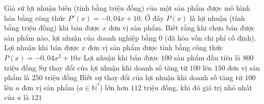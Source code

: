 \begin{ex}%
	Giả sử lợi nhuận biên (tính bằng triệu đồng) của một sản phẩm được mô hình hóa bằng công thức $P'(x)=-0{,}04x+10$. Ở đây $P(x)$ là lợi nhuận (tính bằng triệu đồng) khi bán được $x$ đơn vị sản phẩm. Biết rằng khi chưa bán được sản phẩm nào, lợi nhuận của doanh nghiệp bằng $0$ (đã hòa vốn chi phí cố định).
	\choiceTF
	{Lợi nhuận khi bán được $x$ đơn vị sản phẩm được tính bằng công thức $P(x)=-0{,}04x^2+10x$}
	{\True Lợi nhuận khi bán được $100$ sản phẩm đầu tiên là $800$ triệu đồng}
	{\True Sự thay đổi của lợi nhuận khi doanh số tăng từ $100$ lên $150$ đơn vị sản phẩm là $250$ triệu đồng}
	{\True Biết sự thay đổi của lợi nhuận khi doanh số tăng từ $100$ lên $a$ đơn vị sản phẩm ($a \in \mathbb{N}^*$) lớn hơn $112$ triệu đồng, khi đó giá trị nhỏ nhất của $a$ là $121$}
\end{ex}


